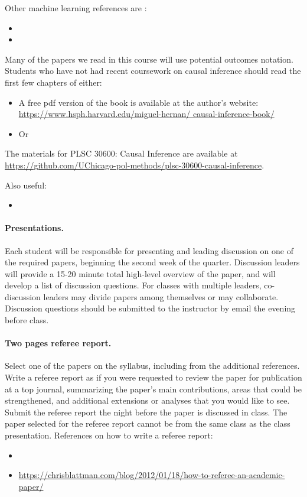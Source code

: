 \documentclass[letterpaper, 12pt, parskip=full,DIV=10]{scrartcl}
\begin{document}
Other machine learning references are :
\begin{itemize}
\item {}
\item {}
\end{itemize}

Many of the papers we read in this course will use potential outcomes notation. Students who have not had recent coursework on causal inference should read the first few chapters of either:
\begin{itemize}
\item
{}

A free pdf version of the book is available at the author's website: \url{https://www.hsph.harvard.edu/miguel-hernan/
causal-inference-book/}
\item 
Or\\
\end{itemize}

The materials for PLSC 30600: Causal Inference are available at \url{https://github.com/UChicago-pol-methods/plsc-30600-causal-inference}. 

Also useful:
\begin{itemize}
\item {}
\end{itemize}



\paragraph{Presentations.}
Each student will be responsible for presenting and leading discussion on one of the required papers, beginning the second week of the quarter. Discussion leaders will provide a 15-20 minute total high-level overview of the paper, and will develop a list of discussion questions. For classes with multiple leaders, co-discussion leaders may divide papers among themselves or may collaborate. Discussion questions should be submitted to the instructor by email the evening before class. 

\paragraph{Two pages referee report.}
Select one of the papers on the syllabus, including from the additional references. Write a referee report as if you were requested to review the paper for publication at a top journal, summarizing the paper's main contributions, areas that could be strengthened, and additional extensions or analyses that you would like to see. Submit the referee report the night before the paper is discussed in class. The paper selected for the referee report cannot be from the same class as the class presentation. 
References on how to write a referee report:
\begin{itemize}
\item {}
 \item \url{https://chrisblattman.com/blog/2012/01/18/how-to-referee-an-academic-paper/}
 \end{itemize}
\end{document}
